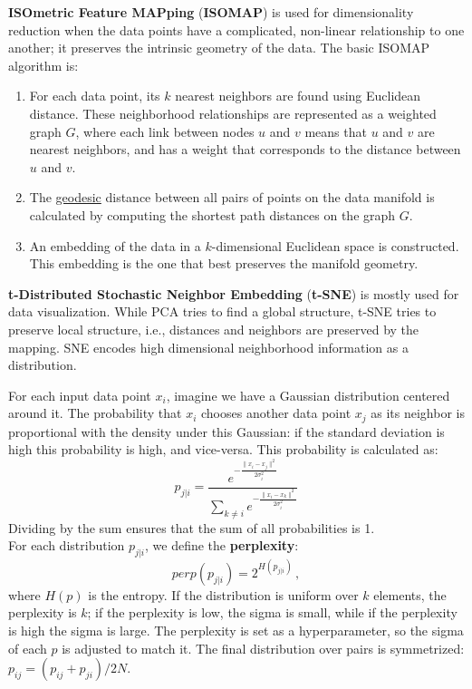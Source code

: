 \textbf{ISOmetric Feature MAPping} (\textbf{ISOMAP}) is used for dimensionality reduction when the data points have a complicated, non-linear relationship to one another; it preserves the intrinsic geometry of the data. The basic ISOMAP algorithm is:
\begin{enumerate}
    \item For each data point, its $k$ nearest neighbors are found using Euclidean distance. These neighborhood relationships are represented as a weighted graph $G$, where each link between nodes $u$ and $v$ means that $u$ and $v$ are nearest neighbors, and has a weight that corresponds to the distance between $u$ and $v$.

    \item The \href{https://en.wikipedia.org/wiki/Geodesic}{geodesic} distance between all pairs of points on the data manifold is calculated by computing the shortest path distances on the graph $G$.

    \item An embedding of the data in a $k$-dimensional Euclidean space is constructed. This embedding is the one that best preserves the manifold geometry.
\end{enumerate}

\textbf{t-Distributed Stochastic Neighbor Embedding} (\textbf{t-SNE}) is mostly used for data visualization. While PCA tries to find a global structure, t-SNE tries to preserve local structure, i.e., distances and neighbors are preserved by the mapping. SNE encodes high dimensional neighborhood information as a distribution.

For each input data point $x_i$, imagine we have a Gaussian distribution centered around it. The probability that $x_i$ chooses another data point $x_j$ as its neighbor is proportional with the density under this Gaussian: if the standard deviation is high this probability is high, and vice-versa. This probability is calculated as:
\begin{equation*}
    p_{j|i} = \dfrac{e^{-\frac{\|x_i - x_j\|^2}{2 \sigma_i^2}}}{\sum_{k \neq i} e^{-\frac{\|x_i - x_k\|^2}{2 \sigma_i^2}}}
\end{equation*}
Dividing by the sum ensures that the sum of all probabilities is 1. \\
For each distribution $p_{j|i}$, we define the \textbf{perplexity}:
\begin{equation*}
    \textit{perp}(p_{j|i}) = 2^{H(p_{j|i})} \,,
\end{equation*}
where $H(p)$ is the entropy. If the distribution is uniform over $k$ elements, the perplexity is $k$; if the perplexity is low, the sigma is small, while if the perplexity is high the sigma is large. The perplexity is set as a hyperparameter, so the sigma of each $p$ is adjusted to match it. The final distribution over pairs is symmetrized: $p_{ij} = (p_{ij} + p_{ji}) / 2N$. 

